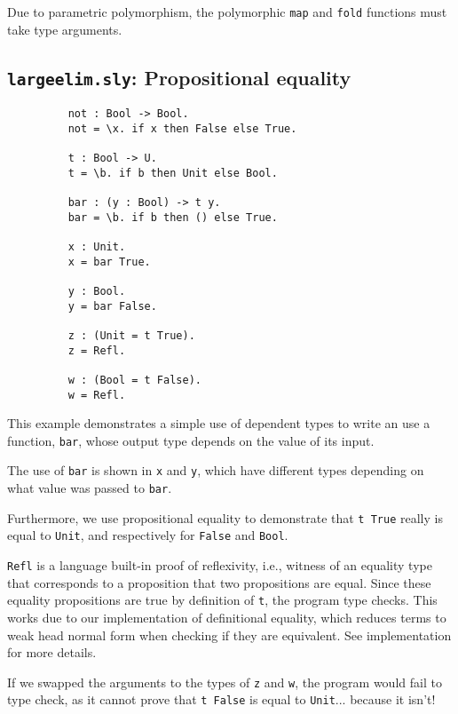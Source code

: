 Due to parametric polymorphism, the polymorphic \texttt{map} and \texttt{fold}
functions must take type arguments.

\subsection{\texttt{largeelim.sly}: Propositional equality}
\begin{figure}[h!]
\begin{lstlisting}
    not : Bool -> Bool.
    not = \x. if x then False else True.
    
    t : Bool -> U.
    t = \b. if b then Unit else Bool.
    
    bar : (y : Bool) -> t y.
    bar = \b. if b then () else True.    

    x : Unit.
    x = bar True.

    y : Bool.
    y = bar False.

    z : (Unit = t True).
    z = Refl.

    w : (Bool = t False).
    w = Refl.
\end{lstlisting}
\end{figure}
This example demonstrates a simple use of dependent types to write an use a
function, \texttt{bar}, whose output type depends on the value of its input.

The use of \texttt{bar} is shown in \texttt{x} and \texttt{y}, which have
different types depending on what value was passed to \texttt{bar}.

Furthermore, we use propositional equality to demonstrate that \texttt{t True}
really is equal to \texttt{Unit}, and respectively for \texttt{False} and
\texttt{Bool}.

\texttt{Refl} is a language built-in proof of reflexivity, i.e., witness of an equality type that
corresponds to a proposition that two propositions are equal.
Since these equality propositions are true by definition of \texttt{t}, the
program type checks. This works due to our implementation of definitional
equality, which reduces terms to weak head normal form when checking if they
are equivalent. See implementation for more details.

If we swapped the arguments to the types of \texttt{z} and \texttt{w}, the
program would fail to type check, as it cannot prove that \texttt{t False} is
equal to \texttt{Unit}... because it isn't!

